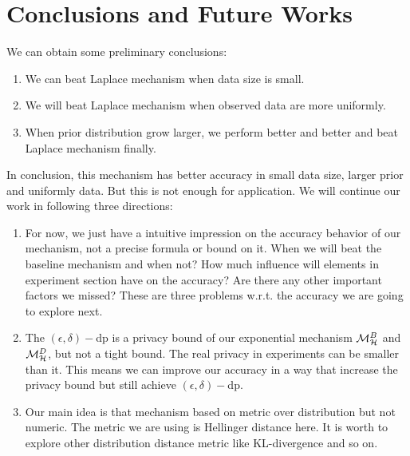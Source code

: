 \documentclass[sigconf, anonymous]{acmart}
\begin{document}


\section{Conclusions and Future Works}
We can obtain some preliminary conclusions: 
\begin{enumerate}
	\item We can beat Laplace mechanism when data size is small.
	\item We will beat Laplace mechanism when observed data are more uniformly.
  \item When prior distribution grow larger, we perform better and better and beat Laplace mechanism finally.
\end{enumerate} 

In conclusion, this mechanism has better accuracy in small data size, larger prior and uniformly data. But this is not enough for application. We will continue our work in following three directions:
\begin{enumerate}
  \item For now, we just have a intuitive impression on the accuracy behavior of our mechanism, not a precise formula or bound on it.  When we will beat the baseline mechanism and when not? How much influence will elements in experiment section have on the accuracy? Are there any other important factors we missed? These are three problems w.r.t. the accuracy we are going to explore next.
  \item The $(\epsilon, \delta)-$dp is a privacy bound of our exponential mechanism $\mathcal{M}^{B}_{\mathcal{H}}$ and $\mathcal{M}^{D}_{\mathcal{H}}$, but not a tight bound. The real privacy in experiments can be smaller than it. This means we can improve our accuracy in a way that increase the privacy bound but still achieve $(\epsilon, \delta)-$dp. 
  \item Our main idea is that mechanism based on metric over distribution but not numeric. The metric we are using is Hellinger distance here. It is worth to explore other distribution distance metric like KL-divergence and so on.
\end{enumerate}





\end{document}
